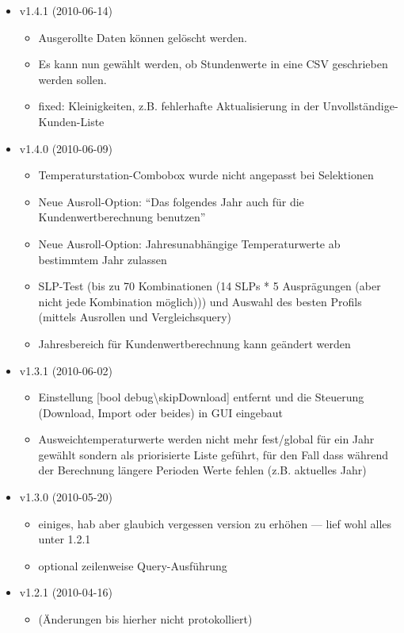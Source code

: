 \begin{itemize}

\item v1.4.1 (2010-06-14)
\begin{itemize}
\item Ausgerollte Daten können gelöscht werden.
\item Es kann nun gewählt werden, ob Stundenwerte in eine CSV geschrieben werden sollen.
\item fixed: Kleinigkeiten, z.B. fehlerhafte Aktualisierung in der Unvollständige-Kunden-Liste
\end{itemize}

\item v1.4.0 (2010-06-09)
\begin{itemize}
\item Temperaturstation-Combobox wurde nicht angepasst bei Selektionen
\item Neue Ausroll-Option: "`Das folgendes Jahr auch für die Kundenwertberechnung benutzen"'
\item Neue Ausroll-Option: Jahresunabhängige Temperaturwerte ab bestimmtem Jahr zulassen
\item SLP-Test (bis zu 70 Kombinationen (14 SLPs * 5 Ausprägungen (aber nicht jede Kombination möglich))) und Auswahl des besten Profils (mittels Ausrollen und Vergleichsquery)
\item Jahresbereich für Kundenwertberechnung kann geändert werden
\end{itemize}

\item v1.3.1 (2010-06-02)
\begin{itemize}
\item Einstellung [bool debug\textbackslash skipDownload] entfernt und die Steuerung (Download, Import oder beides) in GUI eingebaut
\item Ausweichtemperaturwerte werden nicht mehr fest/global für ein Jahr gewählt sondern als priorisierte Liste geführt, für den Fall dass während der Berechnung längere Perioden Werte fehlen (z.B. aktuelles Jahr)
\end{itemize}

\item v1.3.0 (2010-05-20)
\begin{itemize}
\item einiges, hab aber glaubich vergessen version zu erhöhen --- lief wohl alles unter 1.2.1
\item optional zeilenweise Query-Ausführung
\end{itemize}

\item v1.2.1 (2010-04-16)
\begin{itemize}
\item (Änderungen bis hierher nicht protokolliert)
\end{itemize}

\end{itemize}

